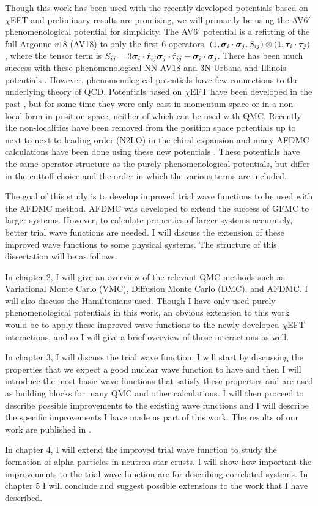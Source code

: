 Though this work has been used with the recently developed potentials based on $\chi$EFT and preliminary results are promising, we will primarily be using the AV6$'$ phenomenological potential for simplicity. The AV6$'$ potential is a refitting of the full Argonne $v18$ (AV18) \cite{wiringa1995} to only the first 6 operators, $(1,\bm{\sigma}_i\cdot\bm{\sigma}_j,S_{ij})\otimes(1,\bm{\tau}_i\cdot\bm{\tau}_j)$, where the tensor term is $S_{ij} = 3\bm{\sigma}_i\cdot\hat{r}_{ij}\bm{\sigma}_j\cdot\hat{r}_{ij}-\bm{\sigma}_i\cdot\bm{\sigma}_j$. There has been much success with these phenomenological NN AV18 and 3N Urbana \cite{carlson1983} and Illinois potentials \cite{pieper2001}. However, phenomenological potentials have few connections to the underlying theory of QCD. Potentials based on $\chi$EFT have been developed in the past \cite{epelbaum2009}, but for some time they were only cast in momentum space or in a non-local form in position space, neither of which can be used with QMC. Recently the non-localities have been removed from the position space potentials up to next-to-next-to leading order (N2LO) in the chiral expansion and many AFDMC calculations have been done using these new potentials \cite{gezerlis2013}. These potentials have the same operator structure as the purely phenomenological potentials, but differ in the cuttoff choice and the order in which the various terms are included.

The goal of this study is to develop improved trial wave functions to be used with the AFDMC method. AFDMC was developed to extend the success of GFMC to larger systems. However, to calculate properties of larger systems accurately, better trial wave functions are needed. I will discuss the extension of these improved wave functions to some physical systems. The structure of this dissertation will be as follows.

In chapter 2, I will give an overview of the relevant QMC methods such as Variational Monte Carlo (VMC), Diffusion Monte Carlo (DMC), and AFDMC. I will also discuss the Hamiltonians used. Though I have only used purely phenomenological potentials in this work, an obvious extension to this work would be to apply these improved wave functions to the newly developed $\chi$EFT interactions, and so I will give a brief overview of those interactions as well.

In chapter 3, I will discuss the trial wave function. I will start by discussing the properties that we expect a good nuclear wave function to have and then I will introduce the most basic wave functions that satisfy these properties and are used as building blocks for many QMC and other calculations. I will then proceed to describe possible improvements to the existing wave functions and I will describe the specific improvements I have made as part of this work. The results of our work are published in \cite{lonardoni2018}.

In chapter 4, I will extend the improved trial wave function to study the formation of alpha particles in neutron star crusts. I will show how important the improvements to the trial wave function are for describing correlated systems. In chapter 5 I will conclude and suggest possible extensions to the work that I have described.
